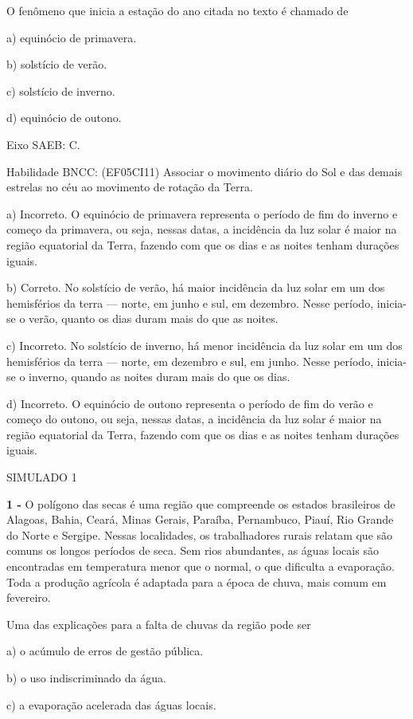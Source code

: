 O fenômeno que inicia a estação do ano citada no texto é chamado de

a) equinócio de primavera.

b) solstício de verão.

c) solstício de inverno.

d) equinócio de outono.

Eixo SAEB: C.

Habilidade BNCC: (EF05CI11) Associar o movimento diário do Sol e das
demais estrelas no céu ao movimento de rotação da Terra.

a) Incorreto. O equinócio de primavera representa o período de fim do
inverno e começo da primavera, ou seja, nessas datas, a incidência da
luz solar é maior na região equatorial da Terra, fazendo com que os dias
e as noites tenham durações iguais.

b) Correto. No solstício de verão, há maior incidência da luz solar em
um dos hemisférios da terra --- norte, em junho e sul, em dezembro.
Nesse período, inicia-se o verão, quanto os dias duram mais do que as
noites.

c) Incorreto. No solstício de inverno, há menor incidência da luz solar
em um dos hemisférios da terra --- norte, em dezembro e sul, em junho.
Nesse período, inicia-se o inverno, quando as noites duram mais do que
os dias.

d) Incorreto. O equinócio de outono representa o período de fim do verão
e começo do outono, ou seja, nessas datas, a incidência da luz solar é
maior na região equatorial da Terra, fazendo com que os dias e as noites
tenham durações iguais.

\protect\hypertarget{_j2c91v4nb3b5}{}{}SIMULADO 1

\textbf{1 -} O polígono das secas é uma região que compreende os estados
brasileiros de Alagoas, Bahia, Ceará, Minas Gerais, Paraíba, Pernambuco,
Piauí, Rio Grande do Norte e Sergipe. Nessas localidades, os
trabalhadores rurais relatam que são comuns os longos períodos de seca.
Sem rios abundantes, as águas locais são encontradas em temperatura
menor que o normal, o que dificulta a evaporação. Toda a produção
agrícola é adaptada para a época de chuva, mais comum em fevereiro.

Uma das explicações para a falta de chuvas da região pode ser

a) o acúmulo de erros de gestão pública.

b) o uso indiscriminado da água.

c) a evaporação acelerada das águas locais.

